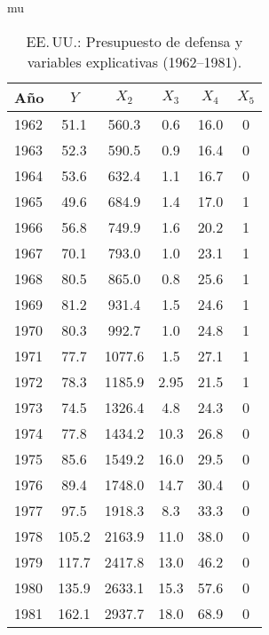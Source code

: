 mu\documentclass[10pt]{article}
\begin{document}
\begin{table}[H]
    \centering
    \begin{tabular}{lccccc}
        \hline
        \textbf{Año} & $Y$ & $X_2$ & $X_3$ & $X_4$ & $X_5$ \\
        \hline
        1962 &  51.1 &  560.3 &  0.6  & 16.0 & 0 \\
        1963 &  52.3 &  590.5 &  0.9  & 16.4 & 0 \\
        1964 &  53.6 &  632.4 &  1.1  & 16.7 & 0 \\
        1965 &  49.6 &  684.9 &  1.4  & 17.0 & 1 \\
        1966 &  56.8 &  749.9 &  1.6  & 20.2 & 1 \\
        1967 &  70.1 &  793.0 &  1.0  & 23.1 & 1 \\
        1968 &  80.5 &  865.0 &  0.8  & 25.6 & 1 \\
        1969 &  81.2 &  931.4 &  1.5  & 24.6 & 1 \\
        1970 &  80.3 &  992.7 &  1.0  & 24.8 & 1 \\
        1971 &  77.7 & 1077.6 &  1.5  & 27.1 & 1 \\
        1972 &  78.3 & 1185.9 &  2.95 & 21.5 & 1 \\
        1973 &  74.5 & 1326.4 &  4.8  & 24.3 & 0 \\
        1974 &  77.8 & 1434.2 & 10.3  & 26.8 & 0 \\
        1975 &  85.6 & 1549.2 & 16.0  & 29.5 & 0 \\
        1976 &  89.4 & 1748.0 & 14.7  & 30.4 & 0 \\
        1977 &  97.5 & 1918.3 &  8.3  & 33.3 & 0 \\
        1978 & 105.2 & 2163.9 & 11.0  & 38.0 & 0 \\
        1979 & 117.7 & 2417.8 & 13.0  & 46.2 & 0 \\
        1980 & 135.9 & 2633.1 & 15.3  & 57.6 & 0 \\
        1981 & 162.1 & 2937.7 & 18.0  & 68.9 & 0 \\
        \hline
    \end{tabular}
    \caption{EE.\,UU.: Presupuesto de defensa y variables explicativas (1962--1981).}
    \label{tab:defensa_usa}
\end{table}
\end{document}
